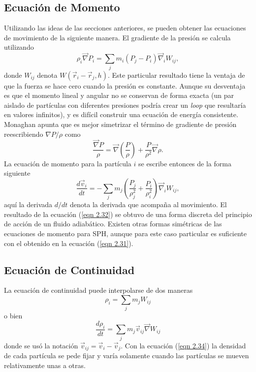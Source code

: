 \documentclass[a4paper,openright,10pt, oneside, final]{book}
\begin{document}
\subsection{Ecuación de Momento}
Utilizando las ideas de las secciones anteriores, se pueden obtener las ecuaciones de movimiento de la siguiente manera. El gradiente de la presión se calcula utilizando 
\begin{equation}
\rho_{i} \vec{\nabla} P_{i}
=
\sum_{j} m_{i} (P_{j}-P_{i})\vec{\nabla}_{i}W_{ij},\label{eqn 2.30}
\end{equation}
donde $W_{ij}$ denota $W(\vec{r}_{i}-\vec{r}_{j},h)$. Este particular resultado tiene la ventaja de que la fuerza se hace cero cuando la presión es constante. Aunque su desventaja es que el momento lineal y angular no se conservan de forma exacta (un par aislado de partículas con diferentes presiones podría crear un \textit{loop} que resultaría en valores infinitos), y es difícil construir una ecuación de energía consistente. Monaghan apunta que es mejor simetrizar el término de gradiente de presión reescribiendo $\nabla P / \rho$ como 
\begin{equation}
\frac{\vec{\nabla} P}{\rho} 
=
\vec{\nabla} \left(\frac{P}{\rho}\right)
+ \frac{P}{\rho^{2}}\vec{\nabla}\rho.\label{eqn 2.31}
\end{equation}
La ecuación de momento para la partícula $i$ se escribe entonces de la forma siguiente
\begin{equation}
\frac{d \vec{v}_{i}}{d t}
=
- \sum_{j} m_{j} 
\left(\frac{P_{j}}{\rho_{j}^{2}}+ \frac{P_{i}}{\rho_{i}^{2}}\right)
\vec{\nabla}_{i}W_{ij}, \label{eqn 2.32}
\end{equation}
aquí la derivada $d/dt$ denota la derivada que acompaña al movimiento. El resultado de la ecuación (\ref{eqn 2.32}) se obtuvo de una forma discreta del principio de acción de un fluido adiabático. Existen otras formas simétricas de las ecuaciones de momento para SPH, aunque para este caso particular es suficiente con el obtenido en la ecuación (\ref{eqn 2.31}).

\subsection{Ecuación de Continuidad}
La ecuación de continuidad puede interpolarse de dos maneras
\begin{equation}
\rho_{i}=\sum_{j}m_{j}W_{ij}\label{eqn 2.33}
\end{equation}
o bien
\begin{equation}
\frac{d\rho_{i}}{d t}
=
\sum_{j}m_{j}\vec{v}_{ij}\vec{\nabla}W_{ij}\label{eqn 2.34}
\end{equation}
donde se usó la notación $\vec{v}_{ij} = \vec{v}_{i}-\vec{v}_{j}$. Con la ecuación (\ref{eqn 2.34}) la densidad de cada partícula se pede fijar y varía solamente cuando las partículas se mueven relativamente unas a otras.
\end{document}
